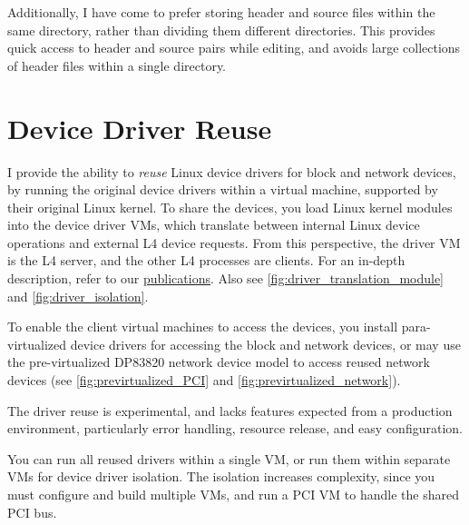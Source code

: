 \documentclass[10pt,a4paper]{article}
\begin{document}
Additionally, I have come to prefer storing header and source files
within the same directory, rather than dividing them different
directories.  This provides quick access to header and source pairs
while editing, and avoids large collections of header files within a
single directory.


\section{Device Driver Reuse}
\label{sec:driver-reuse}

I provide the ability to \emph{reuse} Linux device drivers for block
and network devices, by running the original device drivers within a
virtual machine, supported by their original Linux kernel.  To share
the devices, you load Linux kernel modules into the device driver VMs,
which translate between internal Linux device operations and external
L4 device requests.  From this perspective, the driver VM is the L4
server, and the other L4 processes are clients.  For an in-depth
description, refer to our
\href{http://l4ka.org/projects/virtualization/drivers.php}{publications}.
Also see \autoref{fig:driver_translation_module} and
\autoref{fig:driver_isolation}.

To enable the client virtual machines to access the devices, you
install para-virtualized device drivers for accessing the block and
network devices, or may use the pre-virtualized DP83820 network device
model to access reused network devices (see
\autoref{fig:previrtualized_PCI} and
\autoref{fig:previrtualized_network}).

The driver reuse is experimental, and lacks features expected from a
production environment, particularly error handling, resource release,
and easy configuration.

You can run all reused drivers within a single VM, or run them within
separate VMs for device driver isolation.  The isolation increases
complexity, since you must configure and build multiple VMs, and run a
PCI VM to handle the shared PCI bus.
\end{document}
